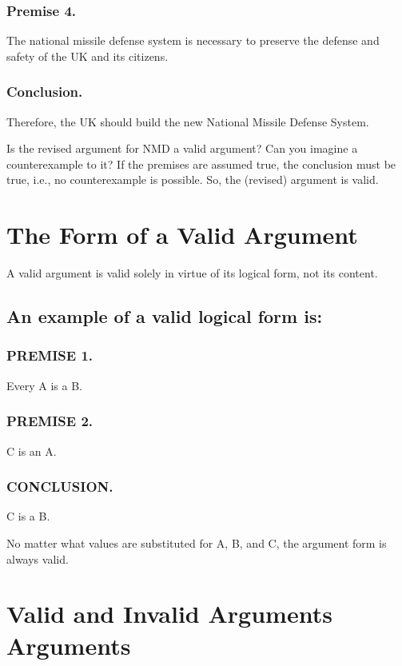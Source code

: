 \documentclass{article}
\begin{document}
\subsubsection{Premise 4.}
 The national missile defense system is necessary to preserve the defense and safety of the UK and its citizens.

\subsubsection{Conclusion.}
 Therefore, the UK should build the new National Missile Defense System.

Is the revised argument for NMD a valid argument?
Can you imagine a counterexample to it?
If the premises are assumed true, the conclusion must be true, i.e., no counterexample is possible.
So, the (revised) argument is valid.

\section{The Form of a Valid Argument}

A valid argument is valid solely in virtue of its logical form, not its content.

\subsection{An example of a valid logical form is:}

\subsubsection{PREMISE 1.}
Every A is a B.

\subsubsection{PREMISE 2.}
C is an A.

\subsubsection{CONCLUSION.}
C is a B.

No matter what values are substituted for A, B, and C, the argument form is always valid.

\section{Valid and Invalid Arguments Arguments}
\end{document}
